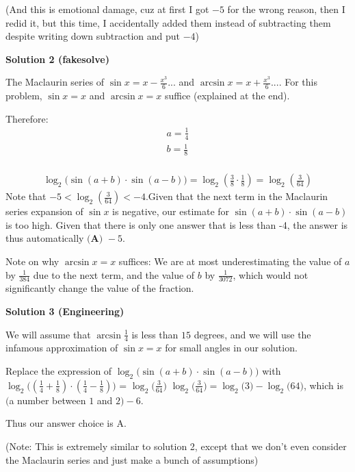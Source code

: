 \begin{enumerate}
 (And this is emotional damage, cuz at first I got $-5$ for the wrong reason, then I redid it, but this time, I accidentally added them instead of subtracting them despite writing down subtraction and put $-4$)

 



\textbf{Solution 2 (fakesolve)}

The Maclaurin series of $\sin{x} = x - \frac{x^3}{6}...$ and $\arcsin{x} = x + \frac{x^3}{6}...$. For this problem, $\sin{x} = x$ and $\arcsin{x} = x$ suffice (explained at the end).

 Therefore:
 \begin{align*} a = \frac{1}{4}\\ b = \frac{1}{8}\\ \end{align*}


 \begin{align*} \log_2\bigl(\sin(a+b)\cdot\sin(a-b)\bigr) = \log_2(\frac{3}{8} \cdot \frac{1}{8}) = \log_2(\frac{3}{64}) \end{align*}
Note that $-5 < \log_2(\frac{3}{64}) < -4$.Given that the next term in the Maclaurin series expansion of $\sin{x}$ is negative, our estimate for $\sin(a+b)\cdot\sin(a-b)$ is too high. Given that there is only one answer that is less than -4, the answer is thus automatically $\boxed{\textbf{(A) }-5}$.

 Note on why $\arcsin{x} = x$ suffices: We are at most underestimating the value of $a$ by $\frac{1}{384}$ due to the next term, and the value of $b$ by $\frac{1}{3072}$, which would not significantly change the value of the fraction.

 



\textbf{Solution 3 (Engineering)}

We will assume that $\arcsin\frac{1}{4}$ is less than $15$ degrees, and we will use the infamous approximation of $\sin{x}={x}$ for small angles in our solution.

 Replace the expression of $\log_2\bigl(\sin(a+b)\cdot\sin(a-b)\bigr)$ with $\log_2\bigl((\frac{1}{4}+\frac{1}{8})\cdot(\frac{1}{4}-\frac{1}{8})\bigr)$ = $\log_2\bigl(\frac{3}{64}\bigr)$
$\log_2\bigl(\frac{3}{64}\bigr)=\log_2\bigl(3\bigr)-\log_2\bigl(64\bigr)$, which is $($a number between $1$ and $2)-6$.

 Thus our answer choice is $\boxed{\text{A}}$.

 (Note: This is extremely similar to solution 2, except that we don't even consider the Maclaurin series and just make a bunch of assumptions)


\end{enumerate}
